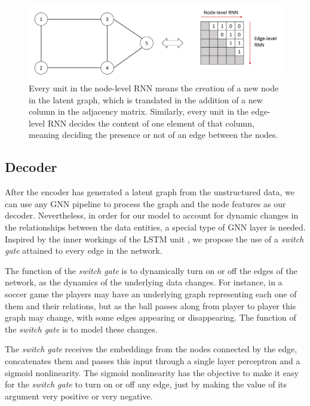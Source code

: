 \documentclass[12pt,a4paper]{article}
\begin{document}
	\begin{figure}[hbtp]
	\includegraphics[width=\textwidth]{rnn_adj.png}
	\caption{Every unit in the node-level RNN means the creation of a new node in the latent graph, which is translated in the addition of a new column in the adjacency matrix. Similarly, every unit in the edge-level RNN decides the content of one element of that column, meaning deciding the presence or not of an edge between the nodes. \label{rnn2}}
	\end{figure}


	\subsection{Decoder}

	After the encoder has generated a latent graph from the unstructured data, we can use any GNN pipeline to process the graph and the node features as our decoder. Nevertheless, in order for our model to account for dynamic changes in the relationships between the data entities, a special type of GNN layer is needed. Inspired by the inner workings of the LSTM unit \citep{HochreiterandSchmidhuber1997}, we propose the use of a \emph{switch gate} attained to every edge in the network.

	The function of the \emph{switch gate} is to dynamically turn on or off the edges of the network, as the dynamics of the underlying data changes. For instance, in a soccer game the players may have an underlying graph representing each one of them and their relations, but as the ball passes along from player to player this graph may change, with some edges appearing or disappearing. The function of the \emph{switch gate} is to model these changes.

	The \emph{switch gate} receives the embeddings from the nodes connected by the edge, concatenates them and passes this input through a single layer perceptron and a sigmoid nonlinearity. The sigmoid nonlinearity has the objective to make it easy for the \emph{switch gate} to turn on or off any edge, just by making the value of its argument very positive or very negative.
\end{document}
